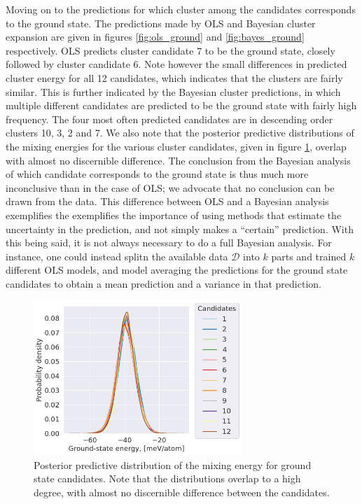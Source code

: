 \documentclass[11pt,a4paper]{article}
\begin{document}
Moving on to the predictions for which cluster among the candidates corresponds to the ground state. The predictions made by OLS and Bayesian cluster expansion are given in figures \ref{fig:ols_ground} and \ref{fig:bayes_ground} respectively. OLS predicts cluster candidate 7 to be the ground state, closely followed by cluster candidate 6. Note however the small differences in predicted cluster energy for all 12 candidates, which indicates that the clusters are fairly similar. This is further indicated by the Bayesian cluster predictions, in which multiple different candidates are predicted to be the ground state with fairly high frequency. The four most often predicted candidates are in descending order clusters 10, 3, 2 and 7. We also note that the posterior predictive distributions of the mixing energies for the various cluster candidates, given in figure \ref{fig:bayes_dist}, overlap with almost no discernible difference. The conclusion from the Bayesian analysis of which candidate corresponds to the ground state is thus much more inconclusive than in the case of OLS; we advocate that no conclusion can be drawn from the data. This difference between OLS and a Bayesian analysis exemplifies the exemplifies the importance of using methods that estimate the uncertainty in the prediction, and not simply makes a ``certain'' prediction. With this being said, it is not always necessary to do a full Bayesian analysis. For instance, one could instead splitn the available data $\mathcal{D}$ into $k$ parts and trained $k$ different OLS models, and model averaging the predictions for the ground state candidates to obtain a mean prediction and a variance in that prediction. 

\begin{figure}[ht]
    \centering
    \includegraphics[width=0.7\textwidth]{figures/task4_bayes_ground.png}
    \caption{Posterior predictive distribution of the mixing energy for ground state candidates. Note that the distributions overlap to a high degree, with almost no discernible difference between the candidates. }
    \label{fig:bayes_dist}
\end{figure}
\end{document}
